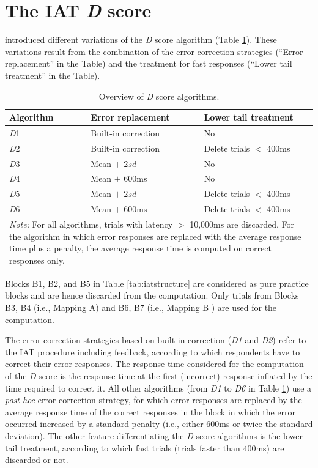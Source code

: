\documentclass[12pt]{book}
\begin{document}
\section{The IAT \emph{D} score}\label{sec:iatD}
 introduced different variations of the \emph{D} score algorithm (Table \ref{tab:Doverview}). These variations result from the combination of the error correction strategies (``Error replacement'' in the Table) and the treatment for fast responses (``Lower tail treatment'' in the Table).
\begin{table}[th!]
	\centering \doublespacing
	\caption{\label{tab:Doverview} Overview of \emph{D} score algorithms. }
	\begin{tabular}{p{2.5cm}p{4.5cm}p{4.5cm}}
		\toprule
		Algorithm & Error replacement & Lower tail treatment\\\hline
		\emph{D}1 & Built-in correction & No \\
		\emph{D}2 & Built-in correction & Delete trials $<$ 400ms \\
		\emph{D}3 & Mean $+$ 2\emph{sd} & No\\
		\emph{D}4 & Mean $+$ 600ms & No \\
		\emph{D}5 & Mean $+$ 2\emph{sd} & Delete trials $<$ 400ms\\
		\emph{D}6 & Mean $+$ 600ms & Delete trials $<$ 400ms \\
		\bottomrule
		\multicolumn{3}{p{12cm}}{\onehalfspacing\emph{Note:} For all algorithms, trials with latency $>$ 10,000ms are discarded. For the algorithm in which error responses are replaced with the average response time plus a penalty, the average response time is computed on correct responses only.}
	\end{tabular}
\end{table}

Blocks B1, B2, and B5 in Table \ref{tab:iatstructure} are considered as pure practice blocks and are hence discarded from the computation. Only trials from Blocks B3, B4 (i.e., Mapping A) and B6, B7 (i.e., Mapping B ) are used for the computation.  

The error correction strategies based on built-in correction (\emph{D1} and \emph{D2}) refer to the IAT procedure including feedback, according to which  respondents have to correct their error responses. The response time considered for the computation of the \emph{D} score is the response time at the first (incorrect) response inflated by the time required to correct it. All other algorithms (from \emph{D1} to \emph{D6} in Table \ref{tab:Doverview}) use a \emph{post-hoc} error correction strategy, for which error responses are replaced by the average response time of the correct responses in the block in which the error occurred increased by a standard penalty (i.e., either 600ms or twice the standard deviation).
The other feature differentiating the \emph{D} score algorithms is the lower tail treatment, according to which fast trials (trials faster than $400$ms) are discarded or not.
\end{document}
